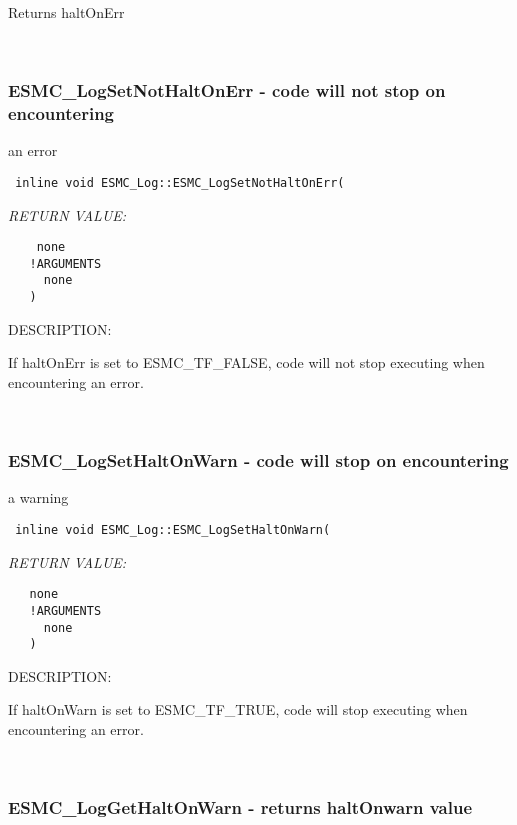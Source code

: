    Returns haltOnErr
    
 
\mbox{}\hrulefill\ 
 

  \subsubsection [ESMC\_LogSetNotHaltOnErr] {ESMC\_LogSetNotHaltOnErr - code will not stop on encountering}


   an error  
  
\begin{verbatim} 
 inline void ESMC_Log::ESMC_LogSetNotHaltOnErr(\end{verbatim}{\em RETURN VALUE:}
\begin{verbatim}    none
   !ARGUMENTS
     none
   )
 \end{verbatim}
{\sf DESCRIPTION:\\ }


   If haltOnErr is set to ESMC\_TF\_FALSE, code will not stop executing when
   encountering an error.
    
 
\mbox{}\hrulefill\ 
 

  \subsubsection [ESMC\_LogSetHaltOnWarn] {ESMC\_LogSetHaltOnWarn - code will stop on encountering}


   a warning
  
\begin{verbatim} 
 inline void ESMC_Log::ESMC_LogSetHaltOnWarn(\end{verbatim}{\em RETURN VALUE:}
\begin{verbatim}   none
   !ARGUMENTS
     none
   )
 \end{verbatim}
{\sf DESCRIPTION:\\ }


   If haltOnWarn is set to ESMC\_TF\_TRUE, code will stop executing when
   encountering an error.
    
 
\mbox{}\hrulefill\ 
 

  \subsubsection [ESMC\_LogGetHaltOnWarn] {ESMC\_LogGetHaltOnWarn - returns haltOnwarn value}


